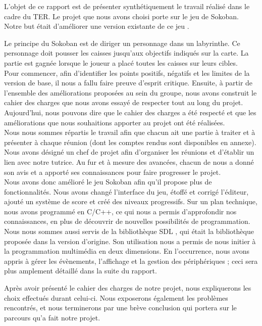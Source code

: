 \documentclass[english,11pt]{report}
\begin{document}
L’objet de ce rapport est de présenter synthétiquement le travail réalisé dans le cadre du TER. Le projet que nous avons choisi porte sur le jeu de Sokoban. Notre but était d’améliorer une version existante de ce jeu \cite{sokoban}.\par
\vspace{0,5cm}
Le principe du Sokoban est de diriger un personnage dans un labyrinthe. Ce personnage doit pousser les caisses jusqu'aux objectifs indiqués sur la carte. La partie est gagnée lorsque le joueur a placé toutes les caisses sur leurs cibles.\\ Pour commencer, afin d'identifier les points positifs, négatifs et les limites de la version de base, il nous a fallu faire preuve d'esprit critique. Ensuite, à partir de l'ensemble des améliorations proposées au sein du groupe, nous avons construit le cahier des charges que nous avons essayé de respecter tout au long du projet. Aujourd’hui, nous pouvons dire que le cahier des charges a été respecté et que les améliorations que nous souhaitions apporter au projet ont été réalisées.\\
Nous nous sommes répartis le travail afin que chacun ait une partie à traiter et à présenter à chaque réunion (dont les comptes rendus sont disponibles en annexe). Nous avons désigné un chef de projet afin d’organiser les réunions et d’établir un lien avec notre tutrice. Au fur et à mesure des avancées, chacun de nous a donné son avis et a apporté ses connaissances pour faire progresser le projet.\\
Nous avons donc amélioré le jeu Sokoban afin qu’il propose plus de fonctionnalités. Nous avons changé l’interface du jeu, étoffé et corrigé l’éditeur, ajouté un système de score et créé des niveaux progressifs. Sur un plan technique, nous avons programmé en C/C++, ce qui nous a permis d’approfondir nos connaissances, en plus de découvrir de nouvelles possibilités de programmation.\\
Nous nous sommes aussi servis de la bibliothèque SDL \cite{SDL}, qui était la bibliothèque proposée dans la version d’origine. Son utilisation nous a permis de nous initier à la programmation multimédia en deux dimensions. En l’occurrence, nous avons appris à gérer les évènements, l’affichage et la gestion des périphériques ; ceci sera plus amplement détaillé dans la suite du rapport.\par
\vspace{0,5cm}
Après avoir présenté le cahier des charges de notre projet, nous expliquerons les choix effectués durant celui-ci. Nous exposerons également les problèmes rencontrés, et nous terminerons par une brève conclusion qui portera sur le parcours qu'a fait notre projet.
\end{document}
